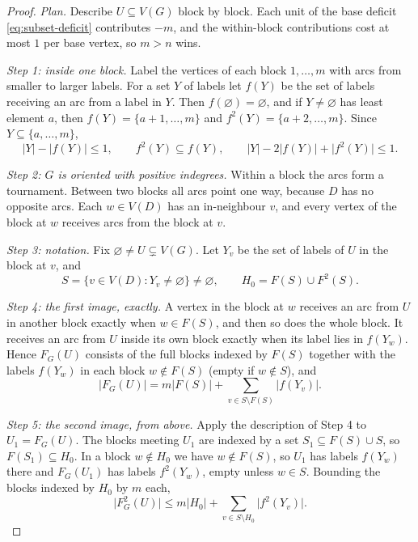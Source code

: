 \documentclass[11pt]{article}
\theoremstyle{remark}
\newcommand{\abs}[1]{\lvert #1\rvert}
\begin{document}
\begin{proof}
\emph{Plan.}  Describe $U\subseteq V(G)$ block by block.  Each unit of the
base deficit \eqref{eq:subset-deficit} contributes $-m$, and the within-block
contributions cost at most $1$ per base vertex, so $m>n$ wins.

\smallskip\noindent\emph{Step 1: inside one block.}
Label the vertices of each block $1,\dots,m$ with arcs from smaller to
larger labels.  For a set $Y$ of labels let $f(Y)$ be the set of labels
receiving an arc from a label in $Y$.  Then $f(\varnothing)=\varnothing$,
and if $Y\ne\varnothing$ has least element $a$, then $f(Y)=\{a+1,\dots,m\}$
and $f^2(Y)=\{a+2,\dots,m\}$.  Since $Y\subseteq\{a,\dots,m\}$,
\begin{equation}
\label{eq:internal-block-bound}
  \abs{Y}-\abs{f(Y)}\le1,\qquad
  f^2(Y)\subseteq f(Y),\qquad
  \abs{Y}-2\abs{f(Y)}+\abs{f^2(Y)}\le1 .
\end{equation}

\smallskip\noindent\emph{Step 2: $G$ is oriented with positive indegrees.}
Within a block the arcs form a tournament.  Between two blocks all arcs point
one way, because $D$ has no opposite arcs.  Each $w\in V(D)$ has an
in-neighbour $v$, and every vertex of the block at $w$ receives arcs from
the block at $v$.

\smallskip\noindent\emph{Step 3: notation.}
Fix $\varnothing\ne U\subsetneq V(G)$.  Let $Y_v$ be the set of labels of
$U$ in the block at $v$, and
\[
  S=\{v\in V(D):Y_v\ne\varnothing\}\ne\varnothing,\qquad
  H_0=F(S)\cup F^2(S).
\]

\smallskip\noindent\emph{Step 4: the first image, exactly.}
A vertex in the block at $w$ receives an arc from $U$ in another block
exactly when $w\in F(S)$, and then so does the whole block.  It receives an
arc from $U$ inside its own block exactly when its label lies in $f(Y_w)$.
Hence $F_G(U)$ consists of the full blocks indexed by $F(S)$ together with
the labels $f(Y_w)$ in each block $w\notin F(S)$ (empty if $w\notin S$), and
\[
  \abs{F_G(U)}=m\abs{F(S)}
     +\sum_{v\in S\setminus F(S)}\abs{f(Y_v)}.
\]

\smallskip\noindent\emph{Step 5: the second image, from above.}
Apply the description of Step 4 to $U_1=F_G(U)$.  The blocks meeting $U_1$
are indexed by a set $S_1\subseteq F(S)\cup S$, so $F(S_1)\subseteq H_0$.
In a block $w\notin H_0$ we have $w\notin F(S)$, so $U_1$ has labels
$f(Y_w)$ there and $F_G(U_1)$ has labels $f^2(Y_w)$, empty unless $w\in S$.
Bounding the blocks indexed by $H_0$ by $m$ each,
\[
  \abs{F_G^2(U)}\le m\abs{H_0}
     +\sum_{v\in S\setminus H_0}\abs{f^2(Y_v)}.
\]


\end{proof}
\end{document}
